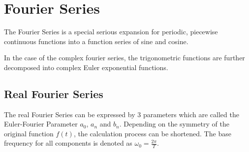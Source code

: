 \documentclass[./\jobname.tex]{subfiles}
\begin{document}
\chapter{Fourier Series}

The Fourier Series is a special serious expansion for periodic, piecewise continuous functions into a function series of sine and cosine.

In the case of the complex fourier series, the trigonometric functions are further decomposed into complex Euler exponential functions. 

\section{Real Fourier Series}
The real Fourier Series can be expressed by 3 parameters which are called the Euler-Fourier Parameter $a_0$, $a_n$ and $b_n$. Depending on the symmetry of the original function $f(t)$, the calculation process can be shortened. The base frequency for all components is denoted as $\omega_0 = \frac{2\pi}{T}$. 

\begin{table}[H]
	\centering
	\noindent{}
\end{table}
\end{document}
